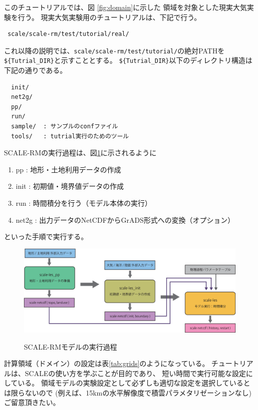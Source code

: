 
このチュートリアルでは、図 \ref{fig:domain}に示した
領域を対象とした現実大気実験を行う。
現実大気実験用のチュートリアルは、下記で行う。
\begin{verbatim}
 scale/scale-rm/test/tutorial/real/
\end{verbatim}
これ以降の説明では、\verb|scale/scale-rm/test/tutorial/|の絶対PATHを
\verb|${Tutrial_DIR}|と示すこととする。
\verb|${Tutrial_DIR}|以下のディレクトリ構造は下記の通りである。
\begin{verbatim}
  init/
  net2g/
  pp/
  run/
  sample/  : サンプルのconfファイル
  tools/   : tutrial実行のためのツール
\end{verbatim}

SCALE-RMの実行過程は、図\ref{fig:howto}に示されるように
\begin{enumerate}
\item pp    : 地形・土地利用データの作成
\item init  : 初期値・境界値データの作成
\item run   : 時間積分を行う（モデル本体の実行）
\item net2g : 出力データのNetCDFからGrADS形式への変換（オプション） 
\end{enumerate}
といった手順で実行する。


\begin{figure}[h]
\begin{center}
  \includegraphics[width=0.9\hsize]{./figure/how_to_run.eps}\\
  \caption{SCALE-RMモデルの実行過程}
  \label{fig:howto}
\end{center}
\end{figure}

計算領域（ドメイン）の設定は表\ref{tab:grids}のようになっている。
チュートリアルは、SCALEの使い方を学ぶことが目的であり、
短い時間で実行可能な設定にしている。
領域モデルの実験設定として必ずしも適切な設定を選択しているとは限らないので
(例えば、15kmの水平解像度で積雲パラメタリゼーションなし)
ご留意頂きたい。

